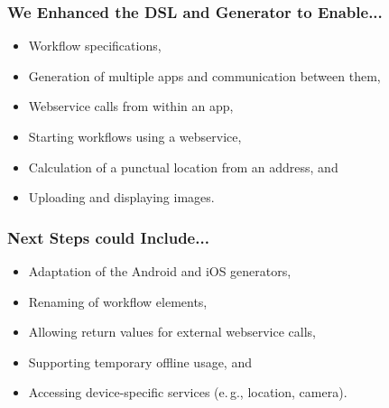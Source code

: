 \begin{frame}
    \frametitle{We Enhanced the DSL and Generator to Enable...}
    
    \begin{itemize}
    	\item Workflow specifications,
    	\item Generation of multiple apps and communication between them,
    	\item Webservice calls from within an app,
    	\item Starting workflows using a webservice,
    	\item Calculation of a punctual location from an address, and
    	\item Uploading and displaying images.
    \end{itemize}

\end{frame}

\begin{frame}
    \frametitle{Next Steps could Include...}

	\begin{itemize}
		\item Adaptation of the Android and iOS generators,
		\item Renaming of workflow elements,
		\item Allowing return values for external webservice calls,
		\item Supporting temporary offline usage, and
		\item Accessing device-specific services (e.\,g., location, camera).
	\end{itemize}
\end{frame}

